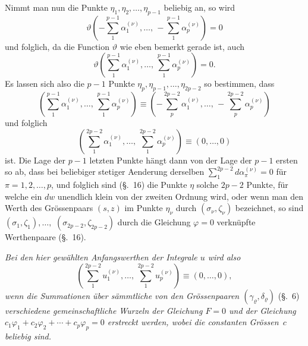 \documentclass[a4paper,12pt,leqno]{article}
\begin{document}
Nimmt man nun die Punkte $\eta_1, \eta_2,\ldots, \eta_{p-1}$
beliebig an, so wird
\[ \vartheta
         \left(
          - \sum\limits_1^{p-1} \alpha_1^{(\nu)},\ldots, \,
          - \sum\limits_1^{p-1} \alpha_p^{(\nu)}
         \right)
   = 0 \]
und folglich, da die Function $\vartheta$ wie eben bemerkt gerade
ist, auch
\[ \vartheta
         \left(
            \sum\limits_1^{p-1} \alpha_1^{(\nu)},\ldots, \,
            \sum\limits_1^{p-1} \alpha_p^{(\nu)}
         \right)
   =  0.\]
Es lassen sich also die $p - 1$ Punkte
$\eta_p, \eta_{p-1},\ldots, \eta_{2p - 2}$
so bestimmen, dass
\[       \left(
            \sum_1^{p-1} \alpha_1^{(\nu)},\ldots, \,
            \sum_1^{p-1} \alpha_p^{(\nu)}
         \right)
   \equiv
         \left(
          - \sum_p^{2p-2} \alpha_1^{(\nu)},\ldots, \,
          - \sum_p^{2p-2} \alpha_p^{(\nu)}
         \right) \]
und folglich
\[       \left(
            \sum_1^{2p-2} \alpha_1^{(\nu)},\ldots, \,
            \sum_1^{2p-2} \alpha_p^{(\nu)}
         \right)
   \equiv (0,\ldots, 0) \]
ist.  Die Lage der $p - 1$ letzten Punkte h\"{a}ngt dann von der
Lage der $p - 1$ ersten so ab, dass bei beliebiger stetiger
Aenderung derselben
$\sum\limits_1^{2p - 2} d\alpha_\pi^{(\nu)} = 0$
f\"{u}r $\pi = 1,2,\ldots, p$, und folglich sind (\S.~16) die
Punkte $\eta$ solche $2p - 2$ Punkte, f\"{u}r welche ein $dw$
unendlich klein von der zweiten Ordnung wird, oder wenn man den
Werth des Gr\"{o}ssenpaars $(s,z)$ im Punkte $\eta_\nu$ durch
$(\sigma_\nu, \zeta_\nu)$ bezeichnet, so sind
$(\sigma_1, \zeta_1),\ldots,$ $(\sigma_{2p-2}, \zeta_{2p-2})$
durch die Gleichung $\varphi = 0$ verkn\"{u}pfte Werthenpaare
(\S.~16).

{\itshape
Bei den hier gew\"{a}hlten Anfangswerthen der Integrale $u$ wird
also
\[       \left(
            \sum_1^{2p-2} u_1^{(\nu)},\ldots, \,
            \sum_1^{2p-2} u_p^{(\nu)}
         \right)
   \equiv (0,\ldots, 0),\]
wenn die Summationen \"{u}ber s\"{a}mmtliche von den
Gr\"{o}ssenpaaren $(\gamma_\varrho, \delta_\varrho)$} (\S.~6)
{\itshape
verschiedene gemeinschaftliche Wurzeln der Gleichung $F = 0$ und
der Gleichung
$c_1 \varphi_1 + c_2 \varphi_2 + \cdots + c_p \varphi_p = 0$
erstreckt werden, wobei die constanten Gr\"{o}ssen~$c$ beliebig
sind.}
\end{document}
